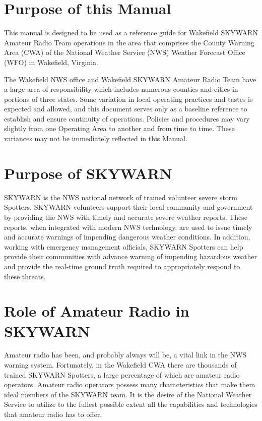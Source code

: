 \documentclass[pdflatex,letterpaper,twoside,12pt]{book}
\begin{document}

\section{Purpose of this Manual}

This manual is designed to be used as a reference guide for Wakefield SKYWARN Amateur Radio Team operations in the area that comprises the County Warning Area (CWA) of the National Weather Service (NWS) Weather Forecast Office (WFO) in Wakefield, Virginia.

The Wakefield NWS office and Wakefield SKYWARN Amateur Radio Team have a large area of responsibility which includes numerous counties and cities in portions of three states.  Some variation in local operating practices and tastes is expected and allowed, and this document serves only as a baseline reference to establish and ensure continuity of operations.  Policies and procedures may vary slightly from one Operating Area to another and from time to time.  These variances may not be immediately reflected in this Manual.


\section{Purpose of SKYWARN}

SKYWARN is the NWS national network of trained volunteer severe storm Spotters. SKYWARN volunteers support their local community and government by providing the NWS with timely and accurate severe weather reports.  These reports, when integrated with modern NWS technology, are used to issue timely and accurate warnings of impending dangerous weather conditions.  In addition, working with emergency management officials, SKYWARN Spotters can help provide their communities with advance warning of impending hazardous weather and provide the real-time ground truth required to appropriately respond to these threats.


\section{Role of Amateur Radio in SKYWARN}

Amateur radio has been, and probably always will be, a vital link in the NWS warning system.  Fortunately, in the Wakefield CWA there are thousands of trained SKYWARN Spotters, a large percentage of which are amateur radio operators.  Amateur radio operators possess many characteristics that make them ideal members of the SKYWARN team.  It is the desire of the National Weather Service to utilize to the fullest possible extent all the capabilities and technologies that amateur radio has to offer.
\end{document}
